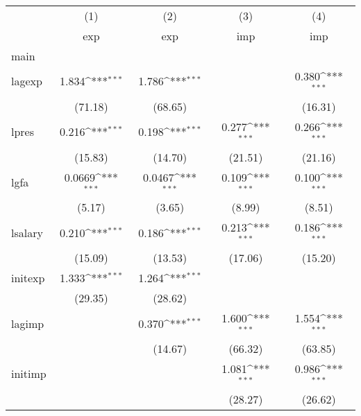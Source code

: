{
\def\sym#1{\ifmmode^{#1}\else\(^{#1}\)\fi}
\begin{tabular}{l*{4}{c}}
\hline\hline
            &\multicolumn{1}{c}{(1)}&\multicolumn{1}{c}{(2)}&\multicolumn{1}{c}{(3)}&\multicolumn{1}{c}{(4)}\\
            &\multicolumn{1}{c}{exp}&\multicolumn{1}{c}{exp}&\multicolumn{1}{c}{imp}&\multicolumn{1}{c}{imp}\\
\hline
main        &                     &                     &                     &                     \\
lagexp      &       1.834\sym{***}&       1.786\sym{***}&                     &       0.380\sym{***}\\
            &     (71.18)         &     (68.65)         &                     &     (16.31)         \\
[1em]
lpres       &       0.216\sym{***}&       0.198\sym{***}&       0.277\sym{***}&       0.266\sym{***}\\
            &     (15.83)         &     (14.70)         &     (21.51)         &     (21.16)         \\
[1em]
lgfa        &      0.0669\sym{***}&      0.0467\sym{***}&       0.109\sym{***}&       0.100\sym{***}\\
            &      (5.17)         &      (3.65)         &      (8.99)         &      (8.51)         \\
[1em]
lsalary     &       0.210\sym{***}&       0.186\sym{***}&       0.213\sym{***}&       0.186\sym{***}\\
            &     (15.09)         &     (13.53)         &     (17.06)         &     (15.20)         \\
[1em]
initexp     &       1.333\sym{***}&       1.264\sym{***}&                     &                     \\
            &     (29.35)         &     (28.62)         &                     &                     \\
[1em]
lagimp      &                     &       0.370\sym{***}&       1.600\sym{***}&       1.554\sym{***}\\
            &                     &     (14.67)         &     (66.32)         &     (63.85)         \\
[1em]
initimp     &                     &                     &       1.081\sym{***}&       0.986\sym{***}\\
            &                     &                     &     (28.27)         &     (26.62)         \\

\end{tabular}}
